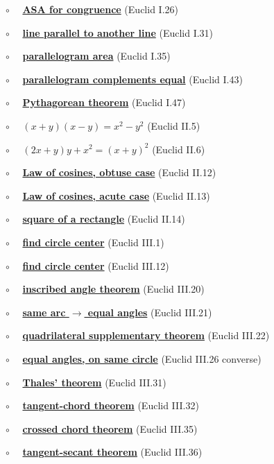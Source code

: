 \documentclass[11pt, oneside]{article}
\begin{document}
$\circ$ \ \ \hyperref[sec:ASA]{\textbf{ASA for congruence}} (Euclid I.26)

$\circ$ \ \ \hyperref[sec:Euclid_I_31]{\textbf{line parallel to another line}} (Euclid I.31)

$\circ$ \ \ \hyperref[sec:Euclid_I_35]{\textbf{parallelogram area}} (Euclid I.35)

$\circ$ \ \ \hyperref[sec:Euclid_I_43]{\textbf{parallelogram complements equal}} (Euclid I.43)

$\circ$ \ \ \hyperref[sec:Euclid_I_47]{\textbf{Pythagorean theorem}} (Euclid I.47)

$\circ$ \ \ \hyperref[sec:Euclid_II_5]{\textbf{$(x+y)(x-y)=x^2 - y^2$}} (Euclid II.5)

$\circ$ \ \ \hyperref[sec:Euclid_II_6]{\textbf{$(2x + y) y + x^2 = (x + y)^2$}} (Euclid II.6)

$\circ$ \ \ \hyperref[sec:law_of_cosines]{\textbf{Law of cosines, obtuse case}} (Euclid II.12)

$\circ$ \ \ \hyperref[sec:law_of_cosines]{\textbf{Law of cosines, acute case}} (Euclid II.13)

$\circ$ \ \ \hyperref[sec:Euclid_II_14]{\textbf{square of a rectangle}} (Euclid II.14)

$\circ$ \ \ \hyperref[sec:find_circle_center]{\textbf{find circle center}} (Euclid III.1)

$\circ$ \ \ \hyperref[sec:Euclid_III_12]{\textbf{find circle center}} (Euclid III.12)

$\circ$ \ \ \hyperref[sec:inscribed_angle_theorem]{\textbf{inscribed angle theorem}} (Euclid III.20)

$\circ$ \ \ \hyperref[sec:angles_on_same_arc]{\textbf{same arc $\rightarrow$ equal angles}} (Euclid III.21)

$\circ$ \ \ \hyperref[sec:quadrilateral_supplementary]{\textbf{quadrilateral supplementary theorem}} (Euclid III.22)

$\circ$ \ \ \hyperref[sec:equal_angle_on_circle_contradiction]{\textbf{equal angles, on same circle}} (Euclid III.26 converse)

$\circ$ \ \ \hyperref[sec:Thales_theorem]{\textbf{Thales' theorem}} (Euclid III.31)

$\circ$ \ \ \hyperref[sec:tangent_chord_theorem]{\textbf{tangent-chord theorem}} (Euclid III.32)

$\circ$ \ \ \hyperref[sec:Euclid_III_35]{\textbf{crossed chord theorem}} (Euclid III.35)

$\circ$ \ \ \hyperref[sec:tangent_secant_theorem]{\textbf{tangent-secant theorem}} (Euclid III.36)
\end{document}
